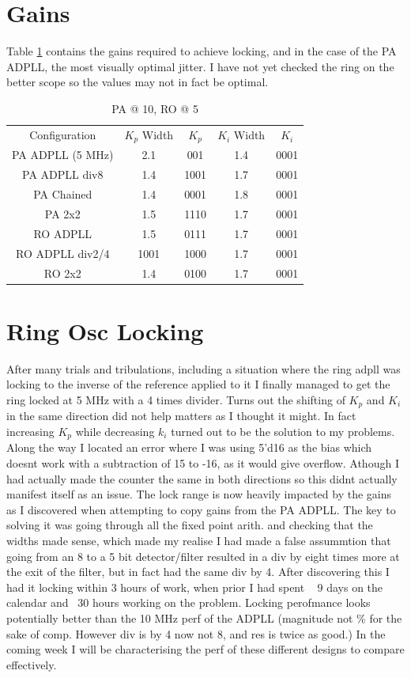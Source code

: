 \documentclass[a4paper,12pt]{report}
\begin{document}
\section*{Gains}
Table \ref{table:sdf} contains the gains required to achieve locking, and in the case of the PA ADPLL, the most visually optimal jitter. I have not yet checked the ring on the better scope so the values may not in fact be optimal.
\begin{table}[!ht]
	\begin{center} 
		\begin{tabular}{c|c|c|c|c}           
			Configuration & $K_p$ Width & $K_p$ & $K_i$ Width & $K_i$ \\
			PA ADPLL (5 MHz) & 2.1 & 001  & 1.4 & 0001 \\
			PA ADPLL div8 & 1.4 & 1001 & 1.7 & 0001 \\
			PA Chained & 1.4 & 0001 & 1.8 & 0001 \\
			PA 2x2 & 1.5 & 1110 & 1.7 & 0001 \\
			RO ADPLL & 1.5 & 0111 & 1.7 & 0001 \\
			RO ADPLL div2/4 & 1001 & 1000 & 1.7 & 0001 \\
            RO 2x2 & 1.4 & 0100 & 1.7 & 0001 \\
		\end{tabular}
		\caption{PA @ 10, RO @ 5}
		\label{table:sdf}
	\end{center}
\end{table}
	
\section*{Ring Osc Locking}
After many trials and tribulations, including a situation where the ring adpll was locking to the inverse of the reference applied to it I finally managed to get the ring locked at 5 MHz with a 4 times divider. Turns out the shifting of $K_p$ and $K_i$ in the same direction did not help matters as I thought it might.
In fact increasing $K_p$ while decreasing $k_i$ turned out to be the solution to my problems.
Along the way I located an error where I was using 5'd16 as the bias which doesnt work with a subtraction of 15 to -16, as it would give overflow. Athough I had actually  made the counter the same in both directions so this didnt actually manifest itself as an issue.
The lock range is now heavily impacted by the gains as I discovered when attempting to copy gains from the PA ADPLL.
The key to solving it was going through all the fixed point arith. and checking that the widths made sense, which made my realise I had made a false assummtion that going from an 8 to a 5 bit detector/filter resulted in a div by eight times more at the exit of the filter, but in fact had the same div by 4.
After discovering this I had it locking within 3 hours of work, when prior I had spent ~ 9 days on the calendar and ~30 hours working on the problem. Locking perofmance looks potentially better than the 10 MHz perf of the ADPLL (magnitude not \% for the sake of comp. However div is by 4 now not 8, and res is twice as good.) In the coming week I will be characterising the perf of these different designs to compare effectively.
\end{document}
